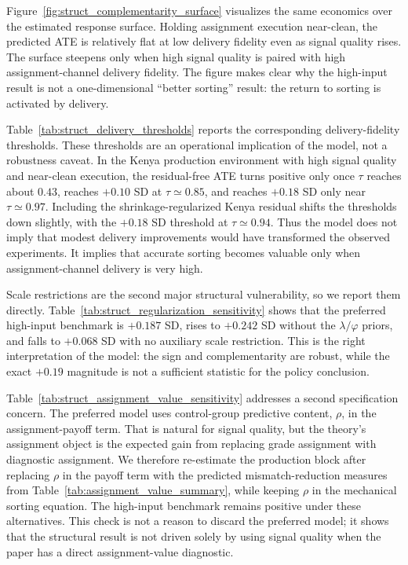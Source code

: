 \documentclass[11pt]{article}
\begin{document}


Figure~\ref{fig:struct_complementarity_surface} visualizes the same economics over the estimated response surface. Holding assignment execution near-clean, the predicted ATE is relatively flat at low delivery fidelity even as signal quality rises. The surface steepens only when high signal quality is paired with high assignment-channel delivery fidelity. The figure makes clear why the high-input result is not a one-dimensional ``better sorting'' result: the return to sorting is activated by delivery.

Table~\ref{tab:struct_delivery_thresholds} reports the corresponding delivery-fidelity thresholds. These thresholds are an operational implication of the model, not a robustness caveat. In the Kenya production environment with high signal quality and near-clean execution, the residual-free ATE turns positive only once $\tau$ reaches about $0.43$, reaches $+0.10$ SD at $\tau \simeq 0.85$, and reaches $+0.18$ SD only near $\tau \simeq 0.97$. Including the shrinkage-regularized Kenya residual shifts the thresholds down slightly, with the $+0.18$ SD threshold at $\tau \simeq 0.94$. Thus the model does not imply that modest delivery improvements would have transformed the observed experiments. It implies that accurate sorting becomes valuable only when assignment-channel delivery is very high.



Scale restrictions are the second major structural vulnerability, so we report them directly. Table~\ref{tab:struct_regularization_sensitivity} shows that the preferred high-input benchmark is $+0.187$ SD, rises to $+0.242$ SD without the $\lambda/\varphi$ priors, and falls to $+0.068$ SD with no auxiliary scale restriction. This is the right interpretation of the model: the sign and complementarity are robust, while the exact $+0.19$ magnitude is not a sufficient statistic for the policy conclusion.



Table~\ref{tab:struct_assignment_value_sensitivity} addresses a second specification concern. The preferred model uses control-group predictive content, $\rho$, in the assignment-payoff term. That is natural for signal quality, but the theory's assignment object is the expected gain from replacing grade assignment with diagnostic assignment. We therefore re-estimate the production block after replacing $\rho$ in the payoff term with the predicted mismatch-reduction measures from Table~\ref{tab:assignment_value_summary}, while keeping $\rho$ in the mechanical sorting equation. The high-input benchmark remains positive under these alternatives. This check is not a reason to discard the preferred model; it shows that the structural result is not driven solely by using signal quality when the paper has a direct assignment-value diagnostic.
\end{document}
